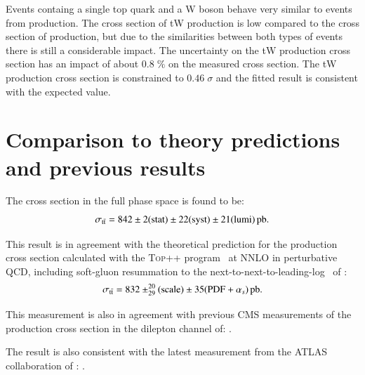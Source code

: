 Events containg a single top quark and a W boson behave very similar to events from \ttbar production. The cross section of tW production is low compared to the cross section of \ttbar production, but due to the similarities between
both types of events there is still a considerable impact. The uncertainty on the tW production cross section has an impact of about $0.8 \; \%$ on the measured \ttbar cross section.
The tW production cross section is constrained to $0.46 \; \sigma$ and the fitted result is consistent with the expected value.


\section{Comparison to theory predictions and previous results}
\label{results_comp}

The cross section in the full phase space is found to be:
\begin{equation}
\sigma_\mathrm{t\bar{t}}  =  842 \pm 2 ({\rm stat}) \pm 22 ({\rm syst}) \pm 21 ({\rm lumi}) \mbox{\ensuremath{\,\text{pb}}}.
\end{equation}
 
This result is in agreement with the theoretical prediction for the \ttbar production cross section calculated with the \textsc{Top++} program~\cite{Czakon:2011xx} at NNLO in perturbative QCD, including soft-gluon resummation to the next-to-next-to-leading-log~\cite{Andreev:2017vxu} of :
\begin{equation}
\sigma_\mathrm{t\bar{t}} =  832 \pm^{20}_{29} {\rm (scale)} \pm 35({\rm PDF}+\alpha_s) \mbox{\ensuremath{\,\text{pb}}}.
\end{equation}

This measurement is also in agreement with previous CMS measurements of the \ttbar production cross section in the dilepton channel of:
.

The result is also consistent with the latest measurement from the ATLAS collaboration of :
.


